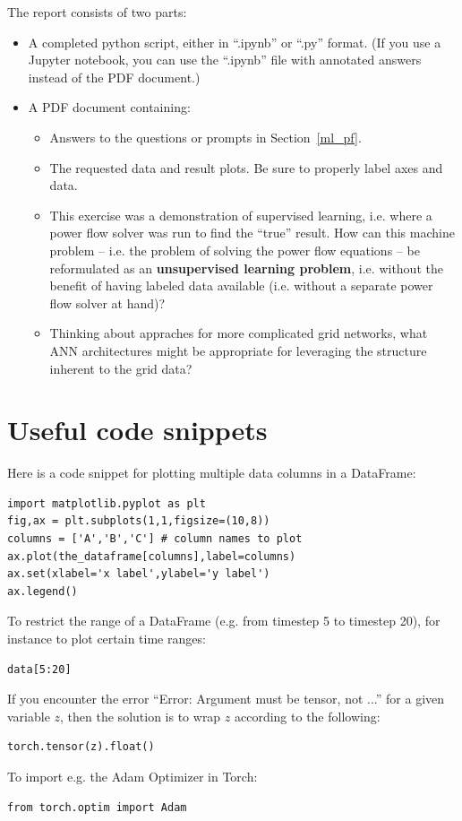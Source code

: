\documentclass[11pt]{article}
\begin{document}
The report consists of two parts:
\begin{itemize}
\item A completed python script, either in ``.ipynb'' or ``.py'' format.
  (If you use a Jupyter notebook, you can use the ``.ipynb'' file with annotated answers instead
  of the PDF document.)
\item A PDF document containing:
  \begin{itemize}
  \item Answers to the questions or prompts in Section~\ref{ml_pf}.
  \item The requested data and result plots. Be sure to properly label axes and data.
  \item This exercise was a demonstration of supervised learning, i.e. where a power flow
    solver was run to find the ``true'' result. How can this machine problem -- i.e. the problem
    of solving the power flow equations -- be reformulated
    as an \textbf{unsupervised learning problem}, i.e. without the benefit of having labeled
    data available (i.e. without a separate power flow solver at hand)?
  \item Thinking about appraches for more complicated grid networks, what ANN architectures
    might be appropriate for leveraging the structure inherent to the grid data?
  \end{itemize}
\end{itemize}

\section{Useful code snippets}

Here is a code snippet for plotting multiple data columns in a DataFrame:

\begin{verbatim}
import matplotlib.pyplot as plt
fig,ax = plt.subplots(1,1,figsize=(10,8))
columns = ['A','B','C'] # column names to plot
ax.plot(the_dataframe[columns],label=columns)
ax.set(xlabel='x label',ylabel='y label')
ax.legend()
\end{verbatim}

To restrict the range of a DataFrame (e.g. from timestep 5 to timestep 20), for instance
to plot certain time ranges:

\begin{verbatim}
data[5:20]
\end{verbatim}

If you encounter the error ``Error: Argument must be tensor, not ...'' for a given variable
$z$, then the solution is to wrap $z$ according to the following:

\begin{verbatim}
torch.tensor(z).float()
\end{verbatim}

To import e.g. the Adam Optimizer in Torch:

\begin{verbatim}
from torch.optim import Adam
\end{verbatim}
\end{document}
